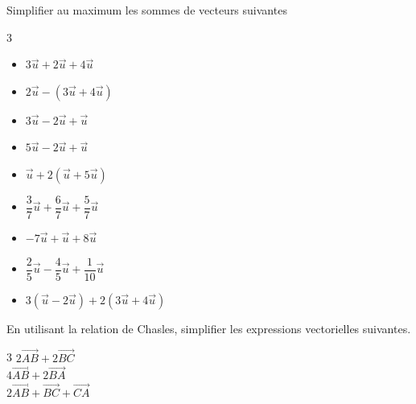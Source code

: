 {\begin{Exercice}
\end{Exercice}




\begin{Exercice} %
Simplifier au maximum les sommes de vecteurs suivantes
\begin{multicols}{3}
\begin{itemize}[label=\textcolor{Couleur6}{$\bullet$}]
\item $3\overrightarrow{u}+2\overrightarrow{u}+4\overrightarrow{u} $\\

\item $2\overrightarrow{u}-(3\overrightarrow{u}+4\overrightarrow{u}) $\\

\item $3\overrightarrow{u}-2\overrightarrow{u}+\overrightarrow{u} $\\

\item $5\overrightarrow{u}-2\overrightarrow{u}+\overrightarrow{u} $\\

\item $\overrightarrow{u}+2(\overrightarrow{u}+5\overrightarrow{u}) $\\

\item $\dfrac{3}{7}\overrightarrow{u}+\dfrac{6}{7}\overrightarrow{u}+\dfrac{5}{7}\overrightarrow{u} $\\

\item $-7\overrightarrow{u}+\overrightarrow{u}+8\overrightarrow{u} $\\

\item $\dfrac{2}{5}\overrightarrow{u}-\dfrac{4}{5}\overrightarrow{u}+\dfrac{1}{10}\overrightarrow{u} $\\

\item $3(\overrightarrow{u}-2\overrightarrow{u})+2(3\overrightarrow{u}+4\overrightarrow{u}) $\\
\end{itemize}
\end{multicols}
\end{Exercice} 

\newpage

\begin{Exercice} %
En utilisant la relation de Chasles, simplifier les expressions vectorielles suivantes.
\begin{multicols}{3}
$2\overrightarrow{AB}+2\overrightarrow{BC}$\\
$4\overrightarrow{AB}+2\overrightarrow{BA}$\\
$2\overrightarrow{AB}+\overrightarrow{BC}+\overrightarrow{CA}$
\end{multicols}
\end{Exercice} 



}
